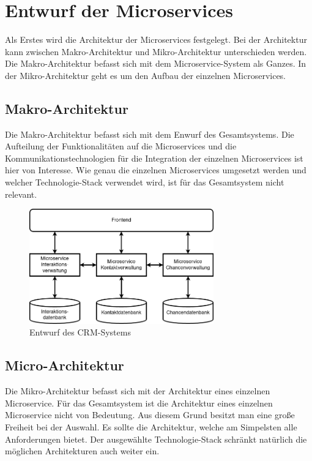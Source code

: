 \section{Entwurf der Microservices}

Als Erstes wird die Architektur der Microservices festgelegt. Bei der Architektur kann zwischen Makro-Architektur und Mikro-Architektur unterschieden werden. Die Makro-Architektur befasst sich mit dem Microservice-System als Ganzes. In der Mikro-Architektur geht es um den Aufbau der einzelnen Microservices.

\subsection{Makro-Architektur}

Die Makro-Architektur befasst sich mit dem Enwurf des Gesamtsystems. Die Aufteilung der Funktionalitäten auf die Microservices und die Kommunikationstechnologien für die Integration der einzelnen Microservices ist hier von Interesse. Wie genau die einzelnen Microservices umgesetzt werden und welcher Technologie-Stack verwendet wird, ist für das Gesamtsystem nicht relevant. 

\begin{figure}[H] 
    \centering
    \includegraphics[width=0.71\textwidth]{figures/CRMEntwurf.png}
    \caption{Entwurf des CRM-Systems}
\end{figure}

\subsection{Micro-Architektur}

Die Mikro-Architektur befasst sich mit der Architektur eines einzelnen Microservice. Für das Gesamtsystem ist die Architektur eines einzelnen Microservice nicht von Bedeutung. Aus diesem Grund besitzt man eine große Freiheit bei der Auswahl. Es sollte die Architektur, welche am Simpelsten alle Anforderungen bietet. Der ausgewählte Technologie-Stack schränkt natürlich die möglichen Architekturen auch weiter ein.

